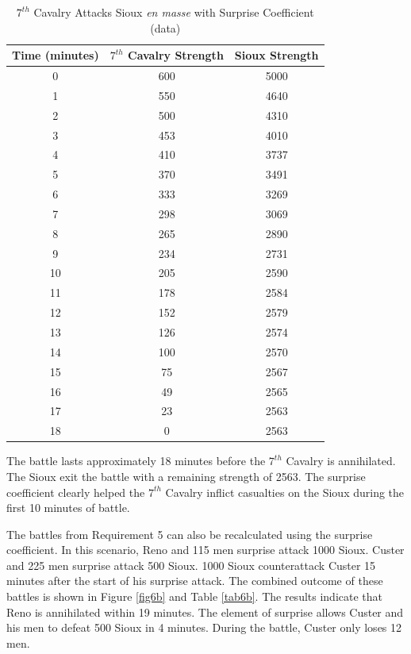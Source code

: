 \documentclass[letterpaper,10pt]{article}
\begin{document}
\begin{table}
\begin{center}
\begin{tabular}[h!tp]{ccc}
\hline
\textbf{Time (minutes)} & \textbf{$7^{th}$ Cavalry Strength} & \textbf{Sioux Strength} \\
\hline\hline
0 &	600 &	5000 \\
1 &	550 &	4640 \\
2 &	500 &	4310 \\
3 &	453 &	4010 \\
4 &	410 &	3737 \\
5 &	370 &	3491 \\
6 &	333 &	3269 \\
7 &	298 &	3069 \\
8 &	265 &	2890 \\
9 &	234 &	2731 \\
10 &	205 &	2590 \\
11 &	178 &	2584 \\
12 &	152 &	2579 \\
13 &	126 &	2574 \\
14 &	100 &	2570 \\
15 &	75 &	2567 \\
16 &	49 &	2565 \\
17 &	23 &	2563 \\
18 &	0 &	2563 \\
\hline
\end{tabular}
\end{center}
\caption{$7^{th}$ Cavalry Attacks Sioux \emph{en masse} with Surprise Coefficient (data)}
\label{tab6a}
\end{table}

The battle lasts approximately 18 minutes before the $7^{th}$ Cavalry is annihilated. The Sioux exit the battle with a remaining strength of 2563.  The surprise coefficient clearly helped the $7^{th}$ Cavalry inflict casualties on the Sioux during the first 10 minutes of battle. 

The battles from Requirement 5 can also be recalculated using the surprise coefficient.  In this scenario, Reno and 115 men surprise attack 1000 Sioux.  Custer and 225 men surprise attack 500 Sioux.  1000 Sioux counterattack Custer 15 minutes after the start of his surprise attack.  The combined outcome of these battles is shown in Figure \ref{fig6b}  and Table \ref{tab6b}.  The results indicate that Reno is annihilated within 19 minutes.  The element of surprise allows Custer and his men to defeat 500 Sioux in 4 minutes. During the battle, Custer only loses 12 men.  
\end{document}
